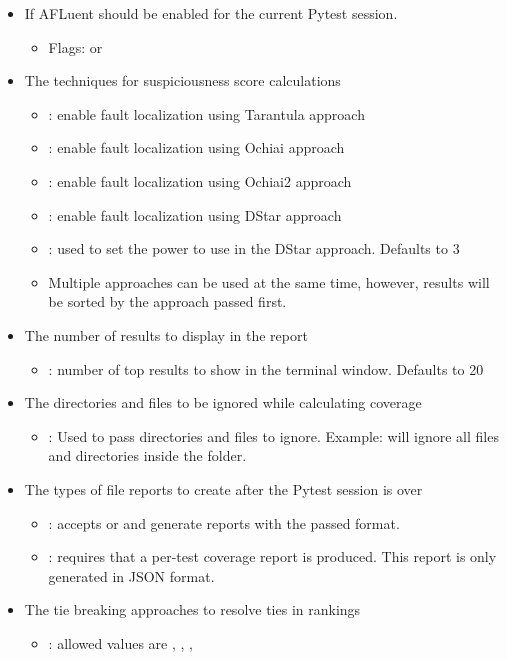 \begin{itemize}
    \item If AFLuent should be enabled for the current Pytest session.
    \begin{itemize}
        \item Flags:  or 
    \end{itemize}
    \item The techniques for suspiciousness score calculations
    \begin{itemize}
        \item {}: enable fault localization using Tarantula approach
        \item {}: enable fault localization using Ochiai approach
        \item {}: enable fault localization using Ochiai2 approach
        \item {}: enable fault localization using DStar approach
        \item {}: used to set the power to use in the DStar
        approach. Defaults to 3
        \item Multiple approaches can be used at the same time, however, results
        will be sorted by the approach passed first.
    \end{itemize}
    \item The number of results to display in the report
    \begin{itemize}
        \item {}: number of top results to show in the
        terminal window. Defaults to 20
    \end{itemize}
    \item The directories and files to be ignored while calculating coverage
    \begin{itemize}
        \item {}: Used to pass directories and files to
        ignore. Example:  will ignore all files and directories
        inside the  folder.
    \end{itemize}
    \item The types of file reports to create after the Pytest session is over
    \begin{itemize}
        \item {}: accepts  or  and generate
        reports with the passed format.
        \item {}: requires that a per-test coverage
        report is produced. This report is only generated in JSON format.
    \end{itemize}
    \item The tie breaking approaches to resolve ties in rankings
    \begin{itemize}
        \item {}: allowed values are ,
        , ,


\end{itemize}
\end{itemize}
